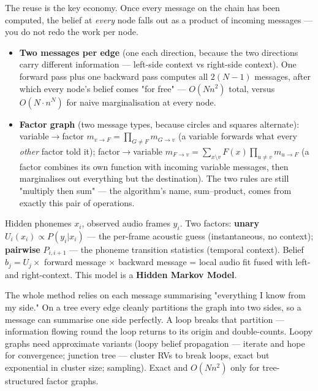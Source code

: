 \documentclass[11pt, a4paper]{article}
\newcommand{\kw}[1]{\textbf{#1}}
\begin{document}
The reuse is the key economy. Once every message on the chain has been computed, the belief at
\emph{every} node falls out as a product of incoming messages — you do not redo the work per node.

\begin{itemize}
  \item \kw{Two messages per edge} (one each direction, because the two directions carry different
  information — left-side context vs right-side context). One forward pass plus one backward pass
  computes all $2(N{-}1)$ messages, after which every node's belief comes "for free" — $O(Nn^2)$
  total, versus $O(N\cdot n^N)$ for naive marginalisation at every node.
  \item \kw{Factor graph} (two message types, because circles and squares alternate):
  variable$\to$factor $m_{v\to F}=\prod_{G\ne F}m_{G\to v}$ (a variable forwards what every
  \emph{other} factor told it); factor$\to$variable
  $m_{F\to v}=\sum_{x\setminus v}F(x)\prod_{u\ne v}m_{u\to F}$ (a factor combines its own function
  with incoming variable messages, then marginalises out everything but the destination). The two
  rules are still "multiply then sum" — the algorithm's name, sum--product, comes from exactly this
  pair of operations.
\end{itemize}

\begin{notebox}
Hidden phonemes $x_i$, observed audio frames $y_i$. Two factors: \kw{unary} $U_i(x_i)\propto P(y_i|x_i)$
— the per-frame acoustic guess (instantaneous, no context); \kw{pairwise} $P_{i,i+1}$ — the phoneme
transition statistics (temporal context). Belief $b_j=U_j\times$ forward message $\times$ backward
message = local audio fit fused with left- and right-context. This model is a \kw{Hidden Markov Model}.
\end{notebox}

\begin{trapbox}
The whole method relies on each message summarising "everything I know from my side." On a tree
every edge cleanly partitions the graph into two sides, so a message can summarise one side
perfectly. A loop breaks that partition — information flowing round the loop returns to its origin
and double-counts. Loopy graphs need approximate variants (loopy belief propagation — iterate and
hope for convergence; junction tree — cluster RVs to break loops, exact but exponential in cluster
size; sampling). Exact and $O(Nn^2)$ only for tree-structured factor graphs.
\end{trapbox}
\end{document}
